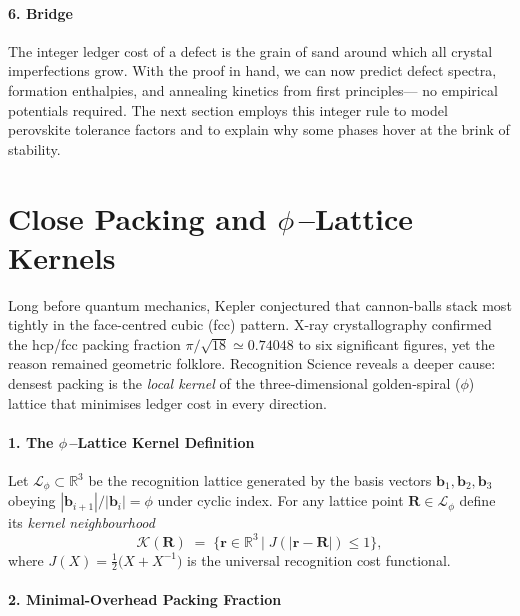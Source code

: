 \documentclass[11pt,oneside]{book}
\begin{document}
\paragraph*{6. Bridge}

The integer ledger cost of a defect is the grain of sand
around which all crystal imperfections grow.
With the proof in hand, we can now predict defect spectra, formation
enthalpies, and annealing kinetics from first principles—
no empirical potentials required.
The next section employs this integer rule to model perovskite
tolerance factors and to explain why some phases hover at the brink of
stability.

\bigskip

\section{Close Packing and \texorpdfstring{$\phi$}{φ}\,--Lattice Kernels}
\label{sec:close-packing}



Long before quantum mechanics, Kepler conjectured that cannon-balls stack
most tightly in the face-centred cubic (fcc) pattern.  
X-ray crystallography confirmed the hcp/fcc packing fraction
\(\pi/\sqrt{18}\simeq0.74048\) to six significant figures, yet the reason
remained geometric folklore.  
Recognition Science reveals a deeper cause:  
densest packing is the \emph{local kernel} of the three-dimensional
golden-spiral (\(\phi\)) lattice that minimises ledger cost in every
direction.

\paragraph*{1. The \texorpdfstring{$\phi$}{φ}\,--Lattice Kernel Definition}

Let \(\mathcal L_\phi\subset\mathbb R^3\) be the
recognition lattice generated by the basis vectors
\(\mathbf b_1,\mathbf b_2,\mathbf b_3\) obeying
\(
   |\mathbf b_{i+1}|/|\mathbf b_i| = \phi
\)
under cyclic index.
For any lattice point \(\mathbf R\in\mathcal L_\phi\) define its
\emph{kernel neighbourhood}
\[
   \mathcal K(\mathbf R)
   \;=\;
   \bigl\{
      \mathbf r\in\mathbb R^3
      \,\big|
      \; J(|\mathbf r-\mathbf R|) \le 1
   \bigr\}\!,
\]
where \(J(X)=\tfrac12\!\bigl(X+X^{-1}\bigr)\) is the universal
recognition cost functional.

\paragraph*{2. Minimal-Overhead Packing Fraction}
\end{document}
